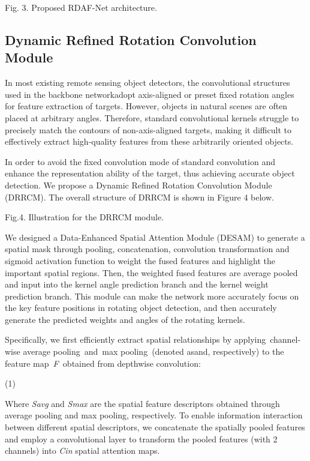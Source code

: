 \documentclass[journal]{IEEEtran}
\begin{document}
Fig. 3. Proposed RDAF-Net architecture.

\subsection{ Dynamic Refined Rotation Convolution Module }

In most existing remote sensing object detectors, the convolutional structures used in the backbone networkadopt axis-aligned or preset fixed rotation angles for feature extraction of targets. However, objects in natural scenes are often placed at arbitrary angles. Therefore, standard convolutional kernels struggle to precisely match the contours of non-axis-aligned targets, making it difficult to effectively extract high-quality features from these arbitrarily oriented objects.

In order to avoid the fixed convolution mode of standard convolution and enhance the representation ability of the target, thus achieving accurate object detection. We propose a Dynamic Refined Rotation Convolution Module (DRRCM). The overall structure of DRRCM is shown in Figure 4 below.

Fig.4. Illustration for the DRRCM module.

We designed a Data-Enhanced Spatial Attention Module (DESAM) to generate a spatial mask through pooling, concatenation, convolution transformation and sigmoid activation function to weight the fused features and highlight the important spatial regions. Then, the weighted fused features are average pooled and input into the kernel angle prediction branch and the kernel weight prediction branch. This module can make the network more accurately focus on the key feature positions in rotating object detection, and then accurately generate the predicted weights and angles of the rotating kernels.

Specifically, we first efficiently extract spatial relationships by applying channel-wise average pooling and max pooling (denoted asand, respectively) to the feature map \textit{F }obtained from depthwise convolution:

	(1)

Where \textit{S}\textit{avg} and \textit{S}\textit{max} are the spatial feature descriptors obtained through average pooling and max pooling, respectively. To enable information interaction between different spatial descriptors, we concatenate the spatially pooled features and employ a convolutional layer to transform the pooled features (with 2 channels) into \textit{C}\textit{in} spatial attention maps.
\end{document}
